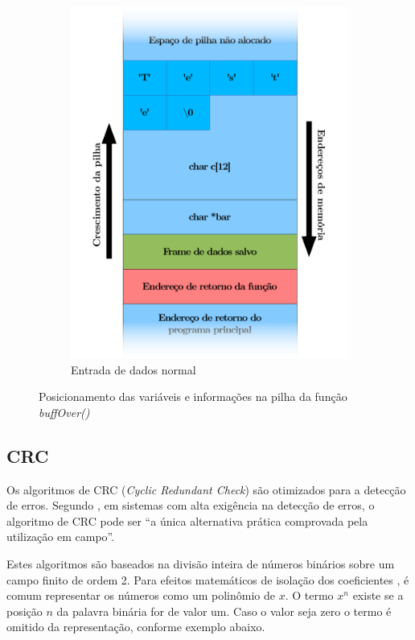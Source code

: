 \documentclass[12pt,openright,oneside,a4paper,brazil]{abntex2}
\begin{document}
\begin{figure}[ht]
        \begin{subfigure}[b]{0.4\textwidth}
        	\includegraphics[width=\textwidth]{img/bufferOverTeste.pdf}
        	\caption{Entrada de dados normal}
        	\label{fig:buffOverTeste}
        \end{subfigure}
        \caption{Posicionamento das variáveis e informações na pilha da função \textit{buffOver()}}
\end{figure}

\subsection{CRC}

Os algoritmos de CRC (\textit{Cyclic Redundant Check}) são otimizados para a detecção de erros. Segundo , em sistemas com alta exigência na detecção de erros, o algoritmo de CRC pode ser ``a única alternativa prática comprovada pela utilização em campo''.

Estes algoritmos são baseados na divisão inteira de números binários sobre um campo finito de ordem 2. Para efeitos matemáticos de isolação dos coeficientes \cite{williams1993painless}, é comum representar os números como um polinômio de $x$. O termo $x^n$ existe se a posição $n$ da palavra binária for de valor um. Caso o valor seja zero o termo é omitido da representação, conforme exemplo abaixo. %
\end{document}
